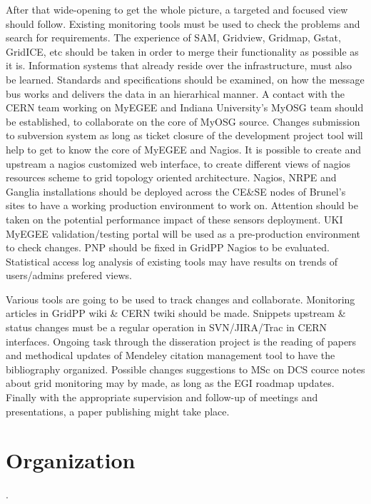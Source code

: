 After that wide-opening to get the whole picture, a targeted and focused
view should follow. Existing monitoring tools must be used to check the problems
and search for requirements. The experience of SAM, Gridview, Gridmap, Gstat,
GridICE, etc should be taken in order to merge their functionality as possible
as it is. Information systems that already reside over the infrastructure, must
also be learned. Standards and specifications should be examined, on how the
message bus works and delivers the data in an hierarhical manner. A contact
with the CERN team working on MyEGEE and Indiana University's MyOSG team should
be established, to collaborate on the core of MyOSG source. Changes submission
to subversion system as long as ticket closure of the development project tool
will help to get to know the core of MyEGEE and Nagios. It is possible to create
and upstream a nagios customized web interface, to create different views of
nagios resources scheme to grid topology oriented architecture. Nagios, NRPE and
Ganglia installations should be deployed across the CE\&SE nodes of Brunel's
sites to have a working production environment to work on. Attention should be
taken on the potential performance impact of these sensors deployment. UKI
MyEGEE validation/testing portal will be used as a pre-production environment
to check changes. PNP should be fixed in GridPP Nagios to be evaluated.
Statistical access log analysis of existing tools may have results on trends of
users/admins prefered views.

Various tools are going to be used to track changes and collaborate. Monitoring
articles in GridPP wiki \& CERN twiki should be made. Snippets upstream \&
status changes must be a regular operation in SVN/JIRA/Trac in CERN interfaces.
Ongoing task through the disseration project is the reading of papers and
methodical updates of Mendeley citation management tool to have the bibliography
organized. Possible changes suggestions to MSc on DCS cource notes about grid
monitoring may by made, as long as the EGI roadmap updates. Finally with the
appropriate supervision and follow-up of meetings and presentations, a paper publishing
might take place.

\section{Organization}.

